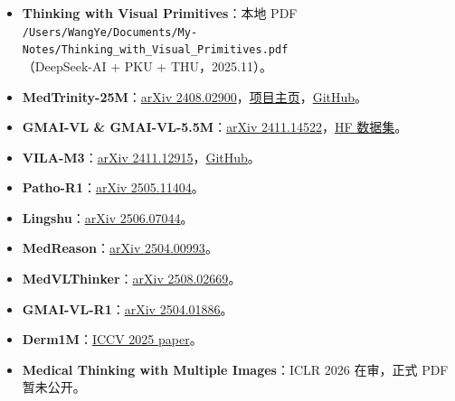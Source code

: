 \begin{itemize}[leftmargin=1.5em]
  \item \textbf{Thinking with Visual Primitives}：本地 PDF \\
        \texttt{\small /Users/WangYe/Documents/My-Notes/Thinking\_with\_Visual\_Primitives.pdf} \\
        （DeepSeek-AI + PKU + THU，2025.11）。
  \item \textbf{MedTrinity-25M}：\href{https://arxiv.org/abs/2408.02900}{arXiv 2408.02900}，\href{https://yunfeixie233.github.io/MedTrinity-25M/}{项目主页}，\href{https://github.com/UCSC-VLAA/MedTrinity-25M}{GitHub}。
  \item \textbf{GMAI-VL \& GMAI-VL-5.5M}：\href{https://arxiv.org/abs/2411.14522}{arXiv 2411.14522}，\href{https://huggingface.co/datasets/OpenGVLab/GMAI-VL-5.5M}{HF 数据集}。
  \item \textbf{VILA-M3}：\href{https://arxiv.org/abs/2411.12915}{arXiv 2411.12915}，\href{https://github.com/Project-MONAI/VLM}{GitHub}。
  \item \textbf{Patho-R1}：\href{https://arxiv.org/abs/2505.11404}{arXiv 2505.11404}。
  \item \textbf{Lingshu}：\href{https://arxiv.org/abs/2506.07044}{arXiv 2506.07044}。
  \item \textbf{MedReason}：\href{https://arxiv.org/abs/2504.00993}{arXiv 2504.00993}。
  \item \textbf{MedVLThinker}：\href{https://arxiv.org/abs/2508.02669}{arXiv 2508.02669}。
  \item \textbf{GMAI-VL-R1}：\href{https://arxiv.org/abs/2504.01886}{arXiv 2504.01886}。
  \item \textbf{Derm1M}：\href{https://openaccess.thecvf.com/content/ICCV2025/papers/Yan_Derm1M_A_Million-scale_Vision-Language_Dataset_Aligned_with_Clinical_Ontology_Knowledge_ICCV_2025_paper.pdf}{ICCV 2025 paper}。
  \item \textbf{Medical Thinking with Multiple Images}：ICLR 2026 在审，正式 PDF 暂未公开。
\end{itemize}
